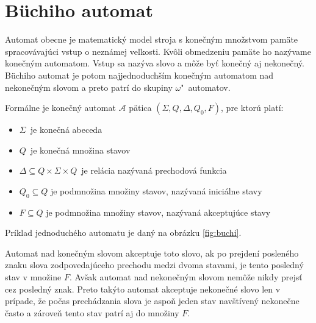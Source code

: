 \documentclass[11pt,final,oneside]{fithesis}
\begin{document}
\section{B\"uchiho automat}	%
\label{sec:buchi}
Automat obecne je matematick\' y model stroja s kone\v cn\' ym mno\v zstvom pam\" ate spracov\' avaj\' uci vstup o nezn\' amej ve\v lkosti. 
Kv\^ oli obmedzeniu pam\" ate ho naz\' yvame kone\v cn\' ym automatom. Vstup sa naz\' yva slovo a m\^ o\v ze by\v t kone\v cn\' y aj nekone\v cn\' y.
B\" uchiho automat je potom najjednoduch\v s\' im kone\v cn\'ym automatom nad nekone\v cn\'ym slovom a preto patr\'i do skupiny {$\omega$"~au\-to\-matov}.

Form\'alne je kone\v cn\' y automat $\mathcal{A}$ p\" atica $(\Sigma, Q, \Delta, Q_0, F)$, pre ktor\' u plat\'i:
\begin{itemize}
\item $\Sigma$\ je kone\v cn\'a abeceda
\item $Q$\ je kone\v cn\'a mno\v zina stavov
\item $\Delta \subseteq Q \times \Sigma \times Q$\ je rel\' acia naz\'yvan\'a prechodov\'a funkcia
\item $Q_0 \subseteq Q$ je podmno\v zina mno\v ziny stavov, naz\' yvan\' a inici\' alne stavy
\item $F \subseteq Q$ je podmno\v zina mno\v ziny stavov, naz\'yvan\'a akceptuj\'uce stavy
\end{itemize}
Pr\'iklad jednoduch\'eho automatu je dan\'y na obr\'azku \ref{fig:buchi}.

Automat nad kone\v cn\'ym slovom akceptuje toto slovo, ak po prejden\' i poslen\'eho znaku slova zodpovedaj\' uceho prechodu medzi dvoma stavami, 
je tento posledn\' y stav v mno\v zine $F$. Av\v sak automat nad nekone\v cn\' ym slovom nem\^ o\v ze nikdy prejs\v t cez posledn\' y znak. Preto tak\' yto 
automat akceptuje nekone\v cn\' e slovo len v pr\' ipade, \v ze po\v cas prech\' adzania slova je aspo\v n jeden stav nav\v st\'iven\'y nekone\v cne \v casto 
a z\'arove\v n tento stav patr\'i aj do mno\v ziny $F$.
\end{document}
